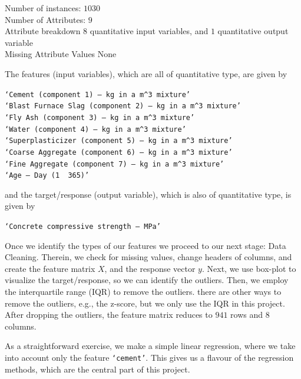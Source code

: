 \documentclass[a4paper,11pt]{amsart}
\begin{document}
\medbreak

\begin{flushleft}
Number of instances: $1030$\\
Number of Attributes: $9$\\
Attribute breakdown $8$ quantitative input variables, and $1$ quantitative output variable\\
Missing Attribute Values None
\end{flushleft}

\medbreak

The features (input variables), which are all of quantitative type, are given by
\begin{flushleft}
\texttt{`Cement (component 1) --  kg in a $m^3$ mixture'}\\
\texttt{`Blast Furnace Slag (component 2) --  kg in a $m^3$ mixture'}\\
\texttt{`Fly Ash (component 3) --  kg in a $m^3$ mixture'}\\
\texttt{`Water (component 4) --  kg in a $m^3$ mixture'}\\
\texttt{`Superplasticizer (component 5) --  kg in a $m^3$ mixture'}\\
\texttt{`Coarse Aggregate (component 6) -- kg in a $m^3$ mixture'}\\
\texttt{`Fine Aggregate (component 7) --  kg in a $m^3$ mixture'}\\
\texttt{`Age -- Day (1~ 365)'}
\end{flushleft}
and the target/response (output variable), which is also of quantitative type, is given by
\begin{flushleft}
\texttt{`Concrete compressive strength -- MPa'}
\end{flushleft}

\medbreak

Once we identify the types of our features we proceed to our next stage: Data Cleaning. Therein, we check for missing values, change headers of columns, and create the feature matrix $X$, and the response vector $y$. Next, we use box-plot to visualize the target/response, so we can identify the outliers. Then, we employ the interquartile range (IQR) to remove the outliers. there are other ways to remove the outliers, e.g., the z-score, but we only use the IQR in this project. After dropping the outliers, the feature matrix reduces to $941$ rows and $8$ columns. 

\medbreak

As a straightforward exercise, we make a simple linear regression, where we take into account only the feature \texttt{`cement'}. This gives us a flavour of the regression methods, which are the central part of this project. 
\end{document}
